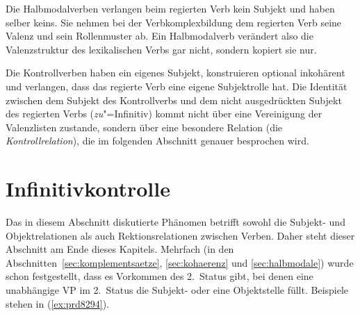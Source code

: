 
Die Halbmodalverben verlangen beim regierten Verb kein Subjekt und haben selber keins.
Sie nehmen bei der Verbkomplexbildung dem regierten Verb seine Valenz und sein Rollenmuster ab.
Ein Halbmodalverb verändert also die Valenzstruktur des lexikalischen Verbs gar nicht, sondern kopiert sie nur.


Die Kontrollverben haben ein eigenes Subjekt, konstruieren optional inkohärent und verlangen, dass das regierte Verb eine eigene Subjektrolle hat.
Die Identität zwischen dem Subjekt des Kontrollverbs und dem nicht ausgedrückten Subjekt des regierten Verbs (\textit{zu}"=Infinitiv) kommt nicht über eine Vereinigung der Valenzlisten zustande, sondern über eine besondere Relation (die \textit{Kontrollrelation}), die im folgenden Abschnitt genauer besprochen wird.




\section{Infinitivkontrolle}

\label{sec:infkonstr}
\label{sec:kontrollinfinitive}


Das in diesem Abschnitt diskutierte Phänomen betrifft sowohl die Subjekt- und Objektrelationen als auch Rektionsrelationen zwischen Verben.
Daher steht dieser Abschnitt am Ende dieses Kapitels.
Mehrfach (\zB in den Abschnitten~\ref{sec:komplementsaetze}, \ref{sec:kohaerenz} und \ref{sec:halbmodale}) wurde schon festgestellt, dass es Vorkommen des 2.~Status gibt, bei denen eine unabhängige VP im 2.~Status \zB die Subjekt- oder eine Objektstelle füllt.
Beispiele stehen in (\ref{ex:prd8294}).

\begin{exe}
  \ex\label{ex:prd8294} 
  \begin{xlist}
  \end{xlist}
\end{exe}

